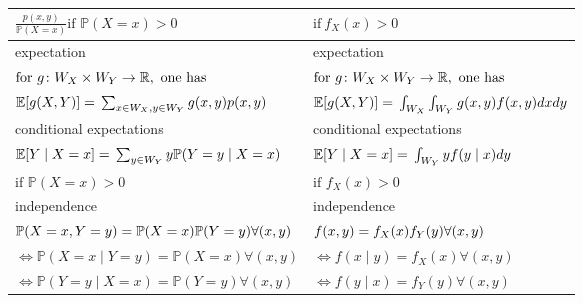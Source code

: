 {\begin{tabularx}{\linewidth}{X|X}
        $\frac{p(x,y)}{\mathbb{P}(X=x)}\text{if }\mathbb{P}(X=x)>0$                & $\mathrm{if~}f_X(x)>0$                                                   \\
        \midrule
        expectation                                                                & expectation                                                              \\
        $\text{for }g\colon W_X\times W_Y\to\mathbb{R},\newline \text{ one has}$   & $\text{for }g\colon W_X\times W_Y\to\mathbb{R},\newline \text{ one has}$ \\
        $\mathbb{E}[g(X,Y)]=\newline\sum_{x\in W_X,y\in W_Y}g(x,y)p(x,y)$          & $\mathbb{E}[g(X,Y)]=\newline\int_{W_X}\int_{W_Y}g(x,y)f(x,y)dxdy$        \\
        \midrule
        conditional expectations                                                   & conditional expectations                                                 \\
        $\mathbb{E}[Y\mid X=x]=\newline \sum_{y\in W_Y}y\mathbb{P}(Y=y\mid X=x)$   & $\mathbb{E}[Y\mid X=x]=\newline \int_{W_Y}yf(y\mid x)dy$                 \\
        $\text{if }\mathbb{P}(X=x)>0$                                              & $\text{if }f_X(x)>0$                                                     \\
        \midrule
        independence                                                               & independence                                                             \\
        $\mathbb{P}(X=x,Y=y)=\newline \mathbb{P}(X=x)\mathbb{P}(Y=y) \forall(x,y)$ & $f(x,y)=\newline f_X(x)f_Y(y) \forall(x,y)$                              \\
        $\Leftrightarrow\mathbb{P}(X=x\mid Y=y)= \mathbb{P}(X=x)\forall(x,y)$      & $\Leftrightarrow f(x\mid y) =f_X(x)\forall(x,y)$                         \\
        $\Leftrightarrow\mathbb{P}(Y=y\mid X=x)= \mathbb{P}(Y=y)\forall(x,y) $     & $\Leftrightarrow f(y\mid x) =f_Y(y)\forall(x,y)$                         \\
    \end{tabularx}
} %

\renewcommand{\arraystretch}{1}
\setlength\tabcolsep{6pt} %